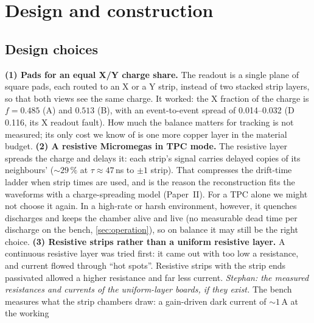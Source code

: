 \section{Design and construction}\label{sec:design}

\subsection{Design choices}\label{sec:design_choices}
\textbf{(1) Pads for an equal X/Y charge share.} The readout is a single plane of square pads, each routed to an X
or a Y strip, instead of two stacked strip layers, so that both views see the same charge. It worked: the X fraction of
the charge is $f=0.485$ (A) and $0.513$ (B), with an event-to-event spread of 0.014--0.032 (D 0.116, its X
readout fault). How much the balance matters for tracking is not measured; its only cost we know of is one more copper
layer in the material budget.
\textbf{(2) A resistive Micromegas in TPC mode.} The resistive layer spreads the charge and delays it: each strip's
signal carries delayed copies of its neighbours' (${\sim}29\,\%$ at $\tau\approx47$\,ns to $\pm1$ strip). That compresses
the drift-time ladder when strip times are used, and is the reason the reconstruction fits the waveforms with a
charge-spreading model (Paper~II). For a TPC alone we might not choose it again. In a high-rate or harsh
environment, however, it quenches discharges and keeps the chamber alive and live (no measurable dead time per discharge
on the bench, \cref{sec:operation}), so on balance it may still be the right choice.
\textbf{(3) Resistive strips rather than a uniform resistive layer.} A continuous resistive layer was tried
first: it came out with too low a resistance, and current flowed through ``hot spots''. Resistive strips with the
strip ends passivated allowed a higher resistance and far less current. \emph{Stephan: the measured resistances and
currents of the uniform-layer boards, if they exist.} The bench measures what the strip chambers draw: a gain-driven dark current of ${\sim}1$\,\textmu A at the working
